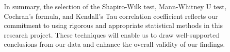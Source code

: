 In summary, the selection of the Shapiro-Wilk test, Mann-Whitney U test, Cochran's formula, and Kendall's Tau correlation coefficient reflects our commitment to using rigorous and appropriate statistical methods in this research project. These techniques will enable us to draw well-supported conclusions from our data and enhance the overall validity of our findings.